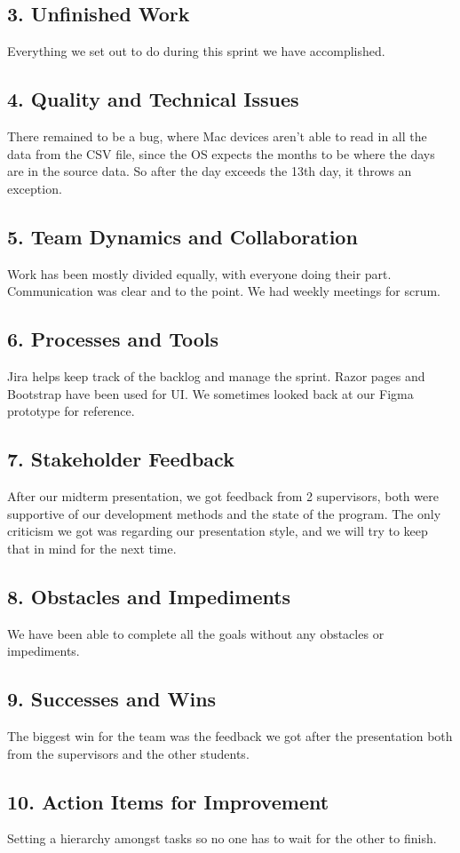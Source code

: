 \documentclass[12pt]{report}
\begin{document}
\subsection*{3. Unfinished Work}
Everything we set out to do during this sprint we have accomplished.
\subsection*{4. Quality and Technical Issues}
There remained to be a bug, where Mac devices aren't able to read in all the data from the CSV file, since the OS expects the months to be where the days are in the source data. So after the day exceeds the 13th day, it throws an exception.
\subsection*{5. Team Dynamics and Collaboration}
Work has been mostly divided equally, with everyone doing their part. Communication was clear and to the point. We had weekly meetings for scrum.
\subsection*{6. Processes and Tools}
Jira helps keep track of the backlog and manage the sprint. Razor pages and Bootstrap have been used for UI. We sometimes looked back at our Figma prototype for reference.
\subsection*{7. Stakeholder Feedback}
After our midterm presentation, we got feedback from 2 supervisors, both were supportive of our development methods and the state of the program. The only criticism we got was regarding our presentation style, and we will try to keep that in mind for the next time.
\subsection*{8. Obstacles and Impediments}
We have been able to complete all the goals without any obstacles or impediments.
\subsection*{9. Successes and Wins}
The biggest win for the team was the feedback we got after the presentation both from the supervisors and the other students.
\subsection*{10. Action Items for Improvement}
Setting a hierarchy amongst tasks so no one has to wait for the other to finish.
\end{document}
